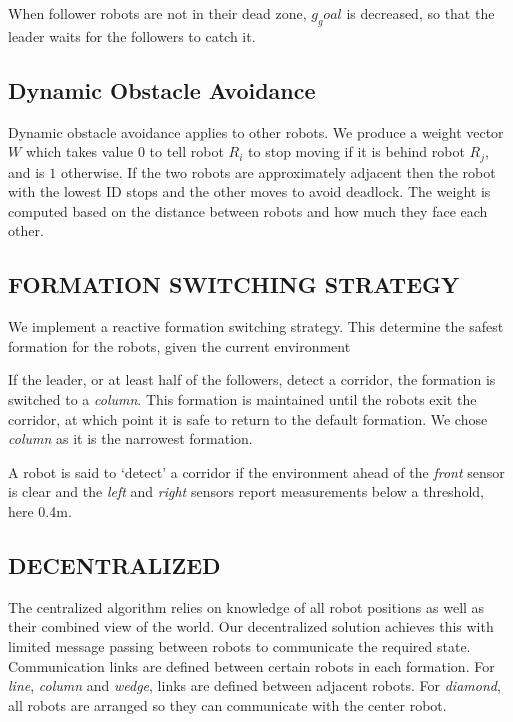 \documentclass[letterpaper, 10 pt, conference]{ieeeconf}  %
\begin{document}
When follower robots are not in their dead zone, $g_goal$ is decreased, so that the leader waits for the followers to catch it.

\subsection{Dynamic Obstacle Avoidance}

Dynamic obstacle avoidance applies to other robots. We produce a weight vector $W$ which takes value $0$ to tell robot $R_i$ to stop moving if it is behind robot $R_j$, and is $1$ otherwise. If the two robots are approximately adjacent then the robot with the lowest ID stops and the other moves to avoid deadlock. The weight is computed based on the distance between robots and how much they face each other.


\subsection{FORMATION SWITCHING STRATEGY}

We implement a reactive formation switching strategy. This determine the safest formation for the robots, given the current environment

If the leader, or at least half of the followers, detect a corridor, the formation is switched to a \textit{column}.
This formation is maintained until the robots exit the corridor, at which point it is safe to return to the default formation. We chose \textit{column} as it is the narrowest formation.

A robot is said to `detect' a corridor if the environment ahead of the \textit{front} sensor is clear and the \textit{left} and \textit{right} sensors report measurements below a threshold, here 0.4m.

\subsection{DECENTRALIZED}

The centralized algorithm relies on knowledge of all robot positions as well as their combined view of the world. Our decentralized solution achieves this with limited message passing between robots to communicate the required state. Communication links are defined between certain robots in each formation. For \textit{line}, \textit{column} and \textit{wedge}, links are defined between adjacent robots. For \textit{diamond}, all robots are arranged so they can communicate with the center robot.
\end{document}
